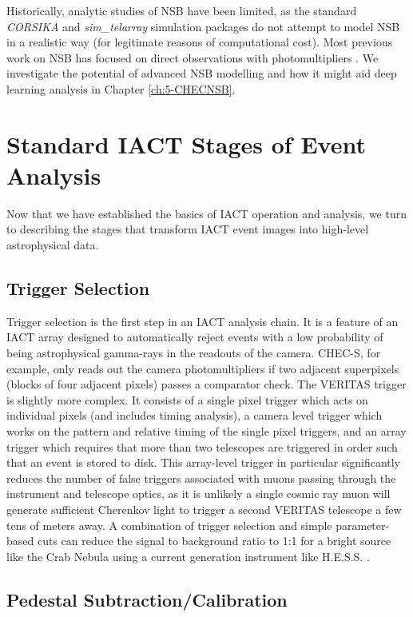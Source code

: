 Historically, analytic studies of NSB have been limited, as the standard \textit{CORSIKA} and \textit{sim\_telarray} simulation packages do not attempt to model NSB in a realistic way (for legitimate reasons of computational cost). Most previous work on NSB has focused on direct observations with photomultipliers \cite{BandE}. We investigate the potential of advanced NSB modelling and how it might aid deep learning analysis in Chapter \ref{ch:5-CHECNSB}.

\section{Standard IACT Stages of Event Analysis}\label{app:imaging}
Now that we have established the basics of IACT operation and analysis, we turn to describing the stages that transform IACT event images into high-level astrophysical data.
\subsection{Trigger Selection}

Trigger selection is the first step in an IACT analysis chain. It is a feature of an IACT array designed to automatically reject events with a low probability of being astrophysical gamma-rays in the readouts of the camera. CHEC-S, for example, only reads out the camera photomultipliers if two adjacent superpixels (blocks of four adjacent pixels) passes a comparator check. The VERITAS trigger is slightly more complex. It consists of a single pixel trigger which acts on individual pixels (and includes timing analysis), a camera level trigger which works on the pattern and relative timing of the single pixel triggers, and an array trigger which requires that more than two telescopes are triggered in order such that an event is stored to disk\cite{veritastrigger}. This array-level trigger in particular significantly reduces the number of false triggers associated with muons passing through the instrument and telescope optics, as it is unlikely a single cosmic ray muon will generate sufficient Cherenkov light to trigger a second VERITAS telescope a few tens of meters away. A combination of trigger selection and simple parameter-based cuts can reduce the signal to background ratio to 1:1 for a bright source like the Crab Nebula using a current generation instrument like H.E.S.S. \cite{Berge07}.

\subsection{Pedestal Subtraction/Calibration}

